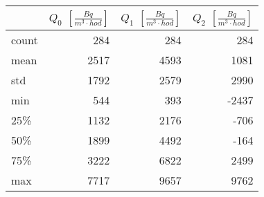 \begin{tabular}{lrrr}
\toprule
{} &  $Q_0$ $\left[\si{\frac{Bq}{m^3\cdot hod}}\right]$ &  $Q_1$ $\left[\si{\frac{Bq}{m^3\cdot hod}}\right]$ &  $Q_2$ $\left[\si{\frac{Bq}{m^3\cdot hod}}\right]$ \\
\midrule
count &                                                284 &                                                284 &                                                284 \\
mean  &                                               2517 &                                               4593 &                                               1081 \\
std   &                                               1792 &                                               2579 &                                               2990 \\
min   &                                                544 &                                                393 &                                              -2437 \\
25\%   &                                               1132 &                                               2176 &                                               -706 \\
50\%   &                                               1899 &                                               4492 &                                               -164 \\
75\%   &                                               3222 &                                               6822 &                                               2499 \\
max   &                                               7717 &                                               9657 &                                               9762 \\
\bottomrule
\end{tabular}
